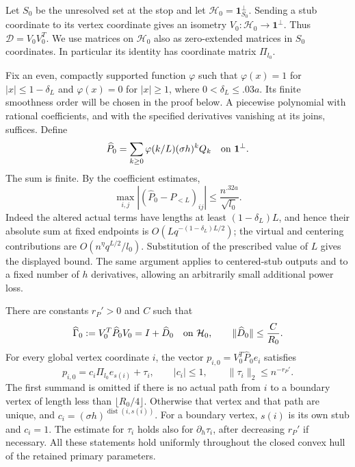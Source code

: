 Let $S_0$ be the unresolved set at the stop and let
$\mathcal H_0=\mathbf 1_{S_0}^{\perp}$.  Sending a stub coordinate to its
vertex coordinate gives an isometry
$V_0:\mathcal H_0\longrightarrow\mathbf 1^\perp$.  Thus
$\mathcal D=V_0V_0^T$.  We use matrices on $\mathcal H_0$ also as
zero-extended matrices in $S_0$ coordinates.  In particular its identity
has coordinate matrix $\Pi_{l_0}$.

Fix an even, compactly supported function $\varphi$ such that
$\varphi(x)=1$ for $|x|\le 1-\delta_L$ and $\varphi(x)=0$ for
$|x|\ge1$, where $0<\delta_L\le .03a$.  Its finite smoothness order
will be chosen in the proof below.  A piecewise polynomial with rational
coefficients, and with the specified derivatives vanishing at its
joins, suffices.  Define
\[
 \widehat P_0=\sum_{k\ge0}\varphi(k/L)(\sigma h)^k Q_k
 \quad\hbox{on }\mathbf 1^\perp.
\]
The sum is finite.  By the coefficient estimates,
\[
 \max_{i,j}|(\widehat P_0-P_{<L})_{ij}|
 \le \frac{n^{.32a}}{\sqrt{l_0}}.
\]
Indeed the altered actual terms have lengths at least
$(1-\delta_L)L$, and hence their absolute sum at fixed endpoints is
$O(Lq^{-(1-\delta_L)L/2})$; the virtual and centering contributions are
$O(n^\eta q^{L/2}/l_0)$.  Substitution of the prescribed value of $L$
gives the displayed bound.  The same argument applies to centered-stub
outputs and to a fixed number of $h$ derivatives, allowing an
arbitrarily small additional power loss.

\begin{lemma}
\label{lem:boundary-smooth-reference}
There are constants $r_P'>0$ and $C$ such that
\begin{equation}
 \widehat\Gamma_0:=V_0^T\widehat P_0V_0
   =I+\widehat D_0\quad\hbox{on }\mathcal H_0,
 \qquad \|\widehat D_0\|\le \frac{C}{R_0}.
 \label{eq:original-40}
\end{equation}
For every global vertex coordinate $i$, the vector
$p_{i,0}=V_0^T\widehat P_0e_i$ satisfies
\begin{equation}
 p_{i,0}=c_i\Pi_{l_0}e_{s(i)}+\tau_i,
 \qquad |c_i|\le1,\qquad \|\tau_i\|_2\le n^{-r_P'}.
 \label{eq:original-41}
\end{equation}
The first summand is omitted if there is no actual path from $i$ to a
boundary vertex of length less than $\lfloor R_0/4\rfloor$.  Otherwise
that vertex and that path are unique, and
$c_i=(\sigma h)^{\operatorname{dist}(i,s(i))}$.
For a boundary vertex, $s(i)$ is its own stub and $c_i=1$.
The estimate for $\tau_i$ holds also for $\partial_h\tau_i$, after
decreasing $r_P'$ if necessary.  All these statements hold uniformly
throughout the closed convex hull of the retained primary parameters.
\end{lemma}

